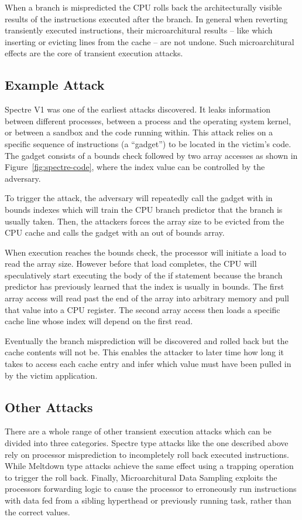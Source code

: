 When a branch is mispredicted the CPU rolls back the architecturally visible results of the instructions executed after the branch.
In general when reverting transiently executed instructions, their microarchitural results -- like which inserting or evicting lines from the cache -- are not undone.
Such microarchitural effects are the core of transient execution attacks.

\subsection*{Example Attack}
Spectre V1 was one of the earliest attacks discovered.
It leaks information between different processes, between a process and the operating system kernel, or between a sandbox and the code running within.
This attack relies on a specific sequence of instructions (a ``gadget'') to be located in the victim's code.
The gadget consists of a bounds check followed by two array accesses as shown in Figure~\ref{fig:spectre-code}, where the index value can be controlled by the adversary.

To trigger the attack, the adversary will repeatedly call the gadget with in bounds indexes which will train the CPU branch predictor that the branch is usually taken.
Then, the attackers forces the array size to be evicted from the CPU cache and calls the gadget with an out of bounds array.

When execution reaches the bounds check, the processor will initiate a load to read the array size.
However before that load completes, the CPU will speculatively start executing the body of the if statement because the branch predictor has previously learned that the index is usually in bounds.
The first array access will read past the end of the array into arbitrary memory and pull that value into a CPU register.
The second array access then loads a specific cache line whose index will depend on the first read.

Eventually the branch misprediction will be discovered and rolled back but the cache contents will not be.
This enables the attacker to later time how long it takes to access each cache entry and infer which value must have been pulled in by the victim application.

\subsection*{Other Attacks}
There are a whole range of other transient execution attacks which can be divided into three categories\cite{TODO}.
Spectre type attacks like the one described above rely on processor misprediction to incompletely roll back executed instructions.
While Meltdown type attacks achieve the same effect using a trapping operation to trigger the roll back.
Finally, Microarchitural Data Sampling exploits the processors forwarding logic to cause the processor to erroneously run instructions with data fed from a sibling hyperthead or previously running task, rather than the correct values.

